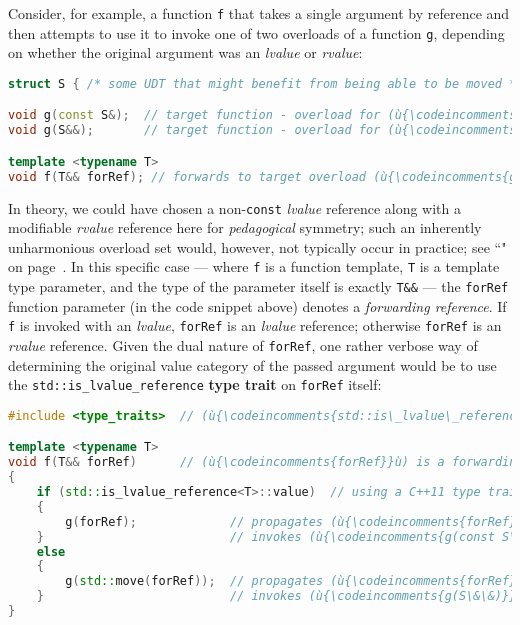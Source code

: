 Consider, for example, a function \texttt{f} that takes a single
argument by reference and then attempts to use it to invoke one of two
overloads of a function \texttt{g}, depending on whether the original
argument was an \emph{lvalue} or \emph{rvalue}:

\begin{lstlisting}[language=C++]
struct S { /* some UDT that might benefit from being able to be moved */ };

void g(const S&);  // target function - overload for (ù{\codeincomments{const}}ù) (ù{\codeincomments{int}}ù) lvalues
void g(S&&);       // target function - overload for (ù{\codeincomments{int}}ù) rvalues only

template <typename T>
void f(T&& forRef); // forwards to target overload (ù{\codeincomments{g}}ù) based on value category
\end{lstlisting}

\noindent In
theory, we could have chosen a non-\texttt{const} \emph{lvalue}
reference along with a modifiable \emph{rvalue} reference here for
\emph{pedagogical} symmetry; such an inherently unharmonious overload
set would, however, not typically occur in practice; see ``" on page~\pageref{Rvalue-References}. In this specific case --- where \texttt{f} is a function template,
\texttt{T} is a template type parameter, and the type of the parameter
itself is exactly \texttt{T\&\&} --- the \texttt{forRef} function
parameter (in the code snippet above) denotes a \emph{forwarding reference}. If \texttt{f}\label{f-invoked-example}
is invoked with an \emph{lvalue}, \texttt{forRef} is an \emph{lvalue}
reference; otherwise \texttt{forRef} is an \emph{rvalue} reference.
Given the dual nature of \texttt{forRef}, one rather verbose way of
determining the original value category of the passed argument would be
to use the \texttt{std::is\_lvalue\_reference} \textbf{type trait} on
\texttt{forRef} itself:

\begin{lstlisting}[language=C++]
#include <type_traits>  // (ù{\codeincomments{std::is\_lvalue\_reference}}ù)

template <typename T>
void f(T&& forRef)      // (ù{\codeincomments{forRef}}ù) is a forwarding reference.
{
    if (std::is_lvalue_reference<T>::value)  // using a C++11 type trait
    {
        g(forRef);             // propagates (ù{\codeincomments{forRef}}ù) as an *lvalue*
    }                          // invokes (ù{\codeincomments{g(const S\&)}}ù)
    else
    {
        g(std::move(forRef));  // propagates (ù{\codeincomments{forRef}}ù) as an *rvalue*
    }                          // invokes (ù{\codeincomments{g(S\&\&)}}ù)
}
\end{lstlisting}

